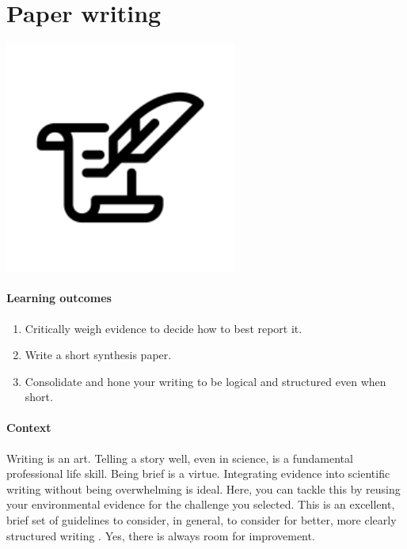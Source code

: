 \documentclass[
]{book}
\providecommand{\tightlist}{%
  \setlength{\itemsep}{0pt}\setlength{\parskip}{0pt}}
\begin{document}
\hypertarget{writing}{%
\chapter{Paper writing}\label{writing}}

\includegraphics[width=3in,height=\textheight]{./paperwriting.png}

\hypertarget{learning-outcomes-9}{%
\subsubsection*{Learning outcomes}\label{learning-outcomes-9}}

\begin{enumerate}
\def\labelenumi{\arabic{enumi}.}
\tightlist
\item
  Critically weigh evidence to decide how to best report it.
\item
  Write a short synthesis paper.\\
\item
  Consolidate and hone your writing to be logical and structured even when short.
\end{enumerate}

\hypertarget{context-8}{%
\subsubsection*{Context}\label{context-8}}

Writing is an art. Telling a story well, even in science, is a fundamental professional life skill. Being brief is a virtue. Integrating evidence into scientific writing without being overwhelming is ideal. Here, you can tackle this by reusing your environmental evidence for the challenge you selected. This is an excellent, brief set of guidelines to consider, in general, to consider for better, more clearly structured writing \citep{RN7239}. Yes, there is always room for improvement.
\end{document}
